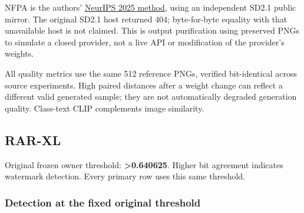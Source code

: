 NFPA is the authors'
\href{https://proceedings.neurips.cc/paper_files/paper/2025/hash/b48405307576689bea14d221ccba73ae-Abstract-Conference.html}{NeurIPS
2025 method}, using an independent SD2.1 public mirror. The original
SD2.1 host returned 404; byte-for-byte equality with that unavailable
host is not claimed. This is output purification using preserved PNGs to
simulate a closed provider, not a live API or modification of the
provider's weights.

All quality metrics use the same 512 reference PNGs, verified
bit-identical across source experiments. High paired distances after a
weight change can reflect a different valid generated sample; they are
not automatically degraded generation quality. Class-text CLIP
complements image similarity.

\subsection{RAR-XL}\label{record-docs-watermarking-images-md-rar-xl}

Original frozen owner threshold: \textbf{\textgreater0.640625}. Higher
bit agreement indicates watermark detection. Every primary row uses this
same threshold.

\subsubsection{Detection at the fixed original
threshold}\label{record-docs-watermarking-images-md-detection-at-the-fixed-original-threshold}

